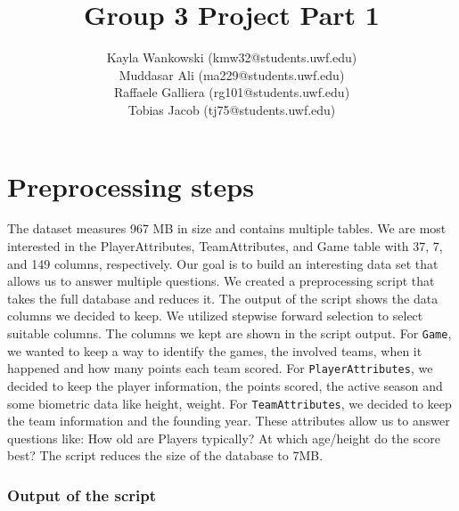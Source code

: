 \documentclass{article}
\begin{document}
\title{Group 3 Project Part 1}
\author{
    Kayla Wankowski (kmw32@students.uwf.edu)\\
    Muddasar Ali (ma229@students.uwf.edu)\\
    Raffaele Galliera (rg101@students.uwf.edu)\\
    Tobias Jacob (tj75@students.uwf.edu)
}

\maketitle

\section{Preprocessing steps}
The dataset measures 967 MB in size and contains multiple tables.
We are most interested in the PlayerAttributes, TeamAttributes, and Game table with 37, 7, and 149 columns, respectively.
Our goal is to build an interesting data set that allows us to answer multiple questions.
We created a preprocessing script that takes the full database and reduces it.
The output of the script shows the data columns we decided to keep.
We utilized stepwise forward selection to select suitable columns.
The columns we kept are shown in the script output.
For \texttt{Game}, we wanted to keep a way to identify the games, the involved teams, when it happened and how many points each team scored.
For \texttt{PlayerAttributes}, we decided to keep the player information, the points scored, the active season and some biometric data like height, weight.
For \texttt{TeamAttributes}, we decided to keep the team information and the founding year.
These attributes allow us to answer questions like: How old are Players typically? At which age/height do the score best?
The script reduces the size of the database to 7MB.

\subsubsection*{Output of the script}
\end{document}
